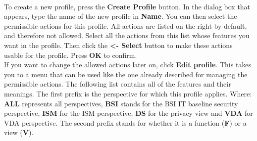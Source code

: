 \documentclass[a4paper,10pt]{book}
\begin{document}
\newline\\
To create a new profile, press the \textbf{Create Profile} button. In the dialog box that appears, type the name of the new profile in
\textbf{Name}. You can then select the permissible actions for this profile. All actions are listed on the right by default, and therefore
not allowed. Select all the actions from this list whose features you want in the profile. Then click the
\textbf{\textless- Select} button to make these actions usable for the profile. Press \textbf{OK} to confirm.
\newline\\
If you want to change the allowed actions later on, click \textbf{Edit profile}. This takes you to a menu that can
be used like the one already described for managing the permissible actions. The following list contains all of
the features and their meanings. The first prefix is the perspective for which this profile applies. Where: \textbf{ALL} represents all perspectives, \textbf{BSI} stands for the BSI IT baseline security perspective, \textbf{ISM} for the ISM perspective, \textbf{DS} for the privacy view and \textbf{VDA} for VDA perspective. The second prefix stands for whether it is a function (\textbf{F}) or a view (\textbf{V}).
\end{document}
